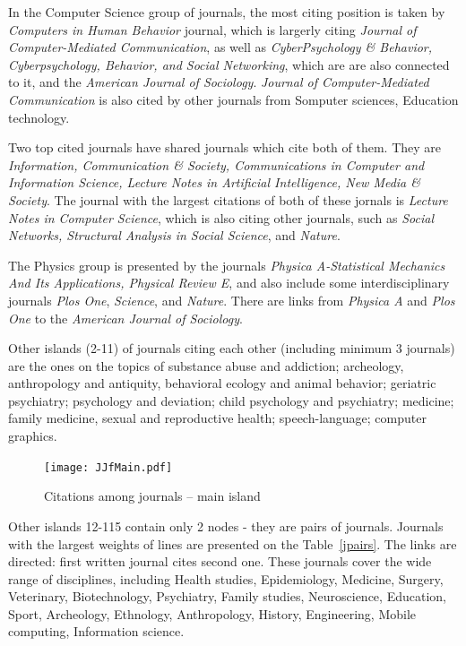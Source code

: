 \documentclass[11pt]{article} %
\begin{document}
In the Computer Science group of journals, the most citing position is taken by \textit{Computers in Human Behavior} journal, which is largerly citing \textit{Journal of Computer-Mediated Communication}, as well as \textit{CyberPsychology \& Behavior, Cyberpsychology, Behavior, and Social Networking}, which are are also connected to it, and the \textit{American Journal of Sociology}. \textit{Journal of Computer-Mediated Communication} is also cited by other journals from Somputer sciences, Education technology. \medskip 

Two top cited journals have shared journals which cite both of them. They are \textit{Information, Communication \& Society, Communications in Computer and Information Science, Lecture Notes in Artificial Intelligence, New Media \& Society}. The journal with the largest citations of both of these jornals is \textit{Lecture Notes in Computer Science}, which is also citing other journals, such as \textit{Social Networks, Structural Analysis in Social Science}, and \textit{Nature}.\medskip 

The Physics group is presented by the journals \textit{Physica A-Statistical Mechanics And Its Applications, Physical Review E}, and also include some interdisciplinary journals \textit{Plos One}, \textit{Science}, and \textit{Nature}. There are links from \textit{Physica A} and \textit{Plos One} to  the \textit{American Journal of Sociology}. \medskip  

Other islands (2-11) of journals citing each other (including minimum 3 journals) are the ones on the topics of substance abuse and addiction; archeology, anthropology and antiquity, behavioral ecology and animal behavior; geriatric psychiatry; psychology and deviation; child psychology and psychiatry; medicine; family medicine, sexual and reproductive health; speech-language; computer graphics. \medskip  

\begin{figure}
\begin{center}
\texttt{[image: JJfMain.pdf]}
\end{center}
\caption{Citations among journals -- main island} \label{jjFmain}
\end{figure}

Other islands 12-115 contain only 2 nodes - they are pairs of journals. Journals with the largest weights of lines are presented on the Table~\ref{jpairs}. The links are directed: first written journal cites second one. These journals cover the wide range of disciplines, including Health studies, Epidemiology, Medicine, Surgery, Veterinary, Biotechnology, Psychiatry, Family studies, Neuroscience, Education, Sport, Archeology, Ethnology, Anthropology, History, Engineering, Mobile computing, Information science.  
\end{document}
